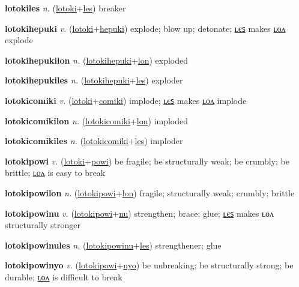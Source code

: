 \textbf{\hypertarget{lotokiles}{lotokiles}} \textit{n.} (\hyperlink{lotoki}{lotoki}+\allowbreak \hyperlink{les}{les})
breaker

\textbf{\hypertarget{lotokihepuki}{lotokihepuki}} \textit{v.} (\hyperlink{lotoki}{lotoki}+\allowbreak \hyperlink{hepuki}{hepuki})
explode; blow up; detonate; \hyperlink{lotokihepukiles}{ʟєꜱ} makes \hyperlink{lotokihepukilon}{ʟᴏᴧ} explode

\textbf{\hypertarget{lotokihepukilon}{lotokihepukilon}} \textit{n.} (\hyperlink{lotokihepuki}{lotokihepuki}+\allowbreak \hyperlink{lon}{lon})
exploded

\textbf{\hypertarget{lotokihepukiles}{lotokihepukiles}} \textit{n.} (\hyperlink{lotokihepuki}{lotokihepuki}+\allowbreak \hyperlink{les}{les})
exploder

\textbf{\hypertarget{lotokicomiki}{lotokicomiki}} \textit{v.} (\hyperlink{lotoki}{lotoki}+\allowbreak \hyperlink{comiki}{comiki})
implode; \hyperlink{lotokicomikiles}{ʟєꜱ} makes \hyperlink{lotokicomikilon}{ʟᴏᴧ} implode

\textbf{\hypertarget{lotokicomikilon}{lotokicomikilon}} \textit{n.} (\hyperlink{lotokicomiki}{lotokicomiki}+\allowbreak \hyperlink{lon}{lon})
imploded

\textbf{\hypertarget{lotokicomikiles}{lotokicomikiles}} \textit{n.} (\hyperlink{lotokicomiki}{lotokicomiki}+\allowbreak \hyperlink{les}{les})
imploder

\textbf{\hypertarget{lotokipowi}{lotokipowi}} \textit{v.} (\hyperlink{lotoki}{lotoki}+\allowbreak \hyperlink{powi}{powi})
be fragile; be structurally weak; be crumbly; be brittle; \hyperlink{lotokipowilon}{ʟᴏᴧ} is easy to break

\textbf{\hypertarget{lotokipowilon}{lotokipowilon}} \textit{n.} (\hyperlink{lotokipowi}{lotokipowi}+\allowbreak \hyperlink{lon}{lon})
fragile; structurally weak; crumbly; brittle

\textbf{\hypertarget{lotokipowinu}{lotokipowinu}} \textit{v.} (\hyperlink{lotokipowi}{lotokipowi}+\allowbreak \hyperlink{nu}{nu})
strengthen; brace; glue; \hyperlink{lotokipowinules}{ʟєꜱ} makes ʟᴏᴧ structurally stronger

\textbf{\hypertarget{lotokipowinules}{lotokipowinules}} \textit{n.} (\hyperlink{lotokipowinu}{lotokipowinu}+\allowbreak \hyperlink{les}{les})
strengthener; glue

\textbf{\hypertarget{lotokipowinyo}{lotokipowinyo}} \textit{v.} (\hyperlink{lotokipowi}{lotokipowi}+\allowbreak \hyperlink{nyo}{nyo})
be unbreaking; be structurally strong; be durable; \hyperlink{lotokipowinyolon}{ʟᴏᴧ} is difficult to break

